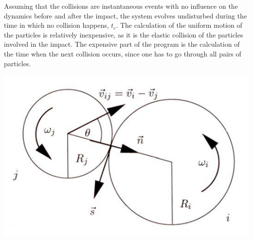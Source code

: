 Assuming that the collisions are instantaneous events with no influence on the dynamics before and after the impact, the system evolves undisturbed during the time in which no collision happens, $t_c$. The calculation of the uniform motion of the particles is relatively inexpensive, as it is the elastic collision of the particles involved in the impact. The expensive part of the program is the calculation of the time when the next collision occurs, since one has to go through all pairs of particles.

\vspace{0.1cm}
\noindent
\begin{minipage}{\textwidth}
\begin{minipage}{.001\textwidth}
 \end{minipage}\hfill
\begin{minipage}{.99\textwidth}
  \centering
  \includegraphics[width=.85\textwidth]{pics/2Dcollision}
  \label{fig:2Dcollision}
\end{minipage}
\end{minipage}
\vspace{0.1cm}


